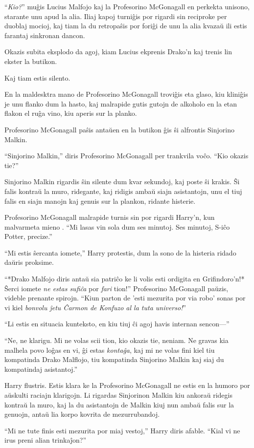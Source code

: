 ``\emph{Kio?}'' muĝis Lucius Malfojo kaj la Profesorino McGonagall en
perkekta unisono, starante unu apud la alia. Iliaj kapoj turniĝis por
rigardi sin reciproke per duoblaj mocioj, kaj tiam la du retropaŝis
por foriĝi de unu la alia kvazaŭ ili estis farantaj sinkronan
dancon.

Okazis subita eksplodo da agoj, kiam Lucius ekprenis Drako'n kaj
trenis lin ekster la butikon.

Kaj tiam estis silento.

En la maldesktra mano de Profesorino McGonagall troviĝis eta glaso,
kiu kliniĝis je unu flanko dum la hasto, kaj malrapide gutis gutojn de
alkoholo en la etan flakon el ruĝa vino, kiu aperis sur la planko.

Profesorino McGonagall paŝis antaŭen en la butikon ĝis ŝi alfrontis
Sinjorino Malkin.

``Sinjorino Malkin,'' diris Profesorino McGonagall per trankvila
voĉo. ``Kio okazis tie?''

Sinjorino Malkin rigardis ŝin silente dum kvar sekundoj, kaj poste ŝi
krakis. Ŝi falis kontraŭ la muro, ridegante, kaj ridigis ambaŭ siajn
asistantojn, unu el tiuj falis en siajn manojn kaj genuis sur la
plankon, ridante histerie.

Profesorino McGonagall malrapide turnis sin por rigardi Harry'n, kun
malvarmeta mieno . ``Mi lasas vin sola dum ses minutoj. Ses minutoj,
S-iĉo Potter, precize.''

``Mi estis ŝercanta iomete,'' Harry protestis, dum la sono de la
histeria ridado daŭris proksime.

``*Drako Malfojo diris antaŭ sia patriĉo ke li volis esti ordigita en
Grifindoro'n!* Ŝerci iomete \emph{ne estas sufiĉa} por \emph{fari}
tion!'' Profesorino McGonagall paŭzis, videble prenante
spirojn. ``Kiun parton de 'esti mezurita por via robo' sonas por vi
kiel \emph{bonvolu ĵetu Ĉarmon de Konfuzo al la tuta universo!}''

``Li estis en situacia kunteksto, en kiu tiuj ĉi agoj havis internan
sencon—''

``Ne, ne klarigu. Mi ne volas scii tion, kio okazis tie, neniam. Ne
gravas kia malhela povo loĝas en vi, ĝi estas \emph{kontaĝa}, kaj mi ne
volas fini kiel tiu kompatinda Drako Malflojo, tiu kompatinda
Sinjorino Malkin kaj siaj du kompatindaj asistantoj.''

Harry flustris. Estis klara ke la Profesorino McGonagall ne estis en
la humoro por aŭskulti raciajn klarigojn. Li rigardas Sinjorinon
Malkin kiu ankoraŭ ridegis kontraŭ la muro, kaj la du asistantojn de
Malkin kiuj nun ambaŭ falis sur la genuojn, antaŭ lia korpo kovrita de
mezurrubandoj.

``Mi ne tute finis esti mezurita por miaj vestoj,'' Harry diris
afable. ``Kial vi ne irus preni alian trinkaĵon?''


